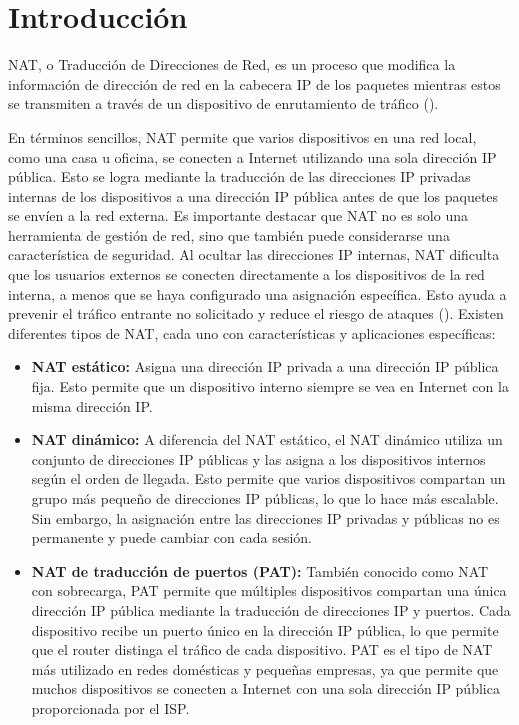 \setcounter{page}{1}

\section{Introducción}
    NAT, o Traducción de Direcciones de Red, es un proceso que modifica la información de dirección de red en la cabecera IP de los paquetes mientras estos se transmiten a través de un dispositivo de enrutamiento de tráfico (\cite{ormeci25}). 
    
    En términos sencillos, NAT permite que varios dispositivos en una red local, como una casa u oficina, se conecten a Internet utilizando una sola dirección IP pública. Esto se logra mediante la traducción de las direcciones IP privadas internas de los dispositivos a una dirección IP pública antes de que los paquetes se envíen a la red externa. Es importante destacar que NAT no es solo una herramienta de gestión de red, sino que también puede considerarse una característica de seguridad. Al ocultar las direcciones IP internas, NAT dificulta que los usuarios externos se conecten directamente a los dispositivos de la red interna, a menos que se haya configurado una asignación específica. Esto ayuda a prevenir el tráfico entrante no solicitado y reduce el riesgo de ataques (\cite{cisco23}).
    Existen diferentes tipos de NAT, cada uno con características y aplicaciones específicas:

    \begin{itemize}
        \item \textbf{NAT estático:} Asigna una dirección IP privada a una dirección IP pública fija. Esto permite que un dispositivo interno siempre se vea en Internet con la misma dirección IP.
        \item \textbf{NAT dinámico:} A diferencia del NAT estático, el NAT dinámico utiliza un conjunto de direcciones IP públicas y las asigna a los dispositivos internos según el orden de llegada. Esto permite que varios dispositivos compartan un grupo más pequeño de direcciones IP públicas, lo que lo hace más escalable. Sin embargo, la asignación entre las direcciones IP privadas y públicas no es permanente y puede cambiar con cada sesión.
        \item \textbf{NAT de traducción de puertos (PAT):} También conocido como NAT con sobrecarga, PAT permite que múltiples dispositivos compartan una única dirección IP pública mediante la traducción de direcciones IP y puertos. Cada dispositivo recibe un puerto único en la dirección IP pública, lo que permite que el router distinga el tráfico de cada dispositivo. PAT es el tipo de NAT más utilizado en redes domésticas y pequeñas empresas, ya que permite que muchos dispositivos se conecten a Internet con una sola dirección IP pública proporcionada por el ISP.
    \end{itemize}

